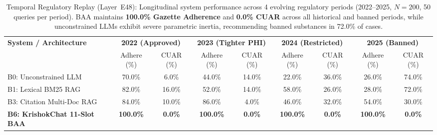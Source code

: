 \begin{table}[t]
\centering\small
\caption{Temporal Regulatory Replay (Layer~E48): Longitudinal system performance across 4 evolving regulatory periods (2022--2025, $N=200$, 50 queries per period). BAA maintains \textbf{100.0\% Gazette Adherence} and \textbf{0.0\% CUAR} across all historical and banned periods, while unconstrained LLMs exhibit severe parametric inertia, recommending banned substances in 72.0\% of cases.}
\label{tab:temporal_regulatory_replay}
\begin{tabular}{lcccccccc}
\toprule
\textbf{System / Architecture} & \multicolumn{2}{c}{\textbf{2022 (Approved)}} & \multicolumn{2}{c}{\textbf{2023 (Tighter PHI)}} & \multicolumn{2}{c}{\textbf{2024 (Restricted)}} & \multicolumn{2}{c}{\textbf{2025 (Banned)}} \\
 & Adhere (\%) & CUAR (\%) & Adhere (\%) & CUAR (\%) & Adhere (\%) & CUAR (\%) & Adhere (\%) & CUAR (\%) \\
\midrule
B0: Unconstrained LLM & 70.0\% & 6.0\% & 44.0\% & 14.0\% & 22.0\% & 36.0\% & 26.0\% & 74.0\% \\
B1: Lexical BM25 RAG & 82.0\% & 16.0\% & 52.0\% & 14.0\% & 58.0\% & 26.0\% & 28.0\% & 72.0\% \\
B3: Citation Multi-Doc RAG & 84.0\% & 10.0\% & 86.0\% & 4.0\% & 46.0\% & 32.0\% & 54.0\% & 30.0\% \\
\textbf{B6: KrishokChat 11-Slot BAA} & \textbf{100.0\%} & \textbf{0.0\%} & \textbf{100.0\%} & \textbf{0.0\%} & \textbf{100.0\%} & \textbf{0.0\%} & \textbf{100.0\%} & \textbf{0.0\%} \\
\bottomrule
\end{tabular}
\end{table}
